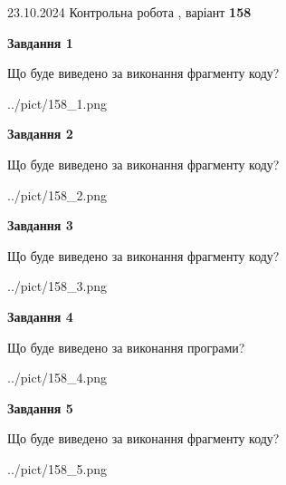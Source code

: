 \documentclass[12pt, ukrainian]{article}
\begin{document}
{\Large{23.10.2024 Контрольна робота , варіант  \No \textbf { 158 }\par}}
{
\begin {large}
{\begin {center}\textbf{Завдання 1}\end {center}}

Що буде виведено за виконання фрагменту коду?\par
\begin{center}
	{../pict/158_1.png}
\end{center}
\newpage

{\begin {center}\textbf{Завдання 2}\end {center}}

Що буде виведено за виконання фрагменту коду?\par
\begin{center}
	{../pict/158_2.png}
\end{center}
\newpage

{\begin {center}\textbf{Завдання 3}\end {center}}

Що буде виведено за виконання фрагменту коду?\par
\begin{center}
	{../pict/158_3.png}
\end{center}
\newpage

{\begin {center}\textbf{Завдання 4}\end {center}}

Що буде виведено за виконання програми?\par
\begin{center}
	{../pict/158_4.png}
\end{center}
\newpage

{\begin {center}\textbf{Завдання 5}\end {center}}

Що буде виведено за виконання фрагменту коду?\par
\begin{center}
	{../pict/158_5.png}
\end{center}
\newpage


\end{large}}
\end{document}
